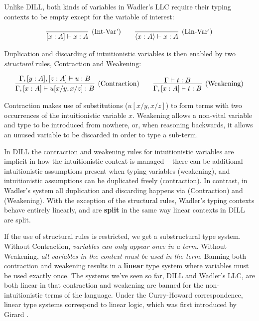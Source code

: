 \documentclass[]{unswthesis}
\newcommand{\types}{\vdash}
\let\i\textit
\let\b\textbf
\let\t\text
\begin{document}
Unlike DILL, both kinds of variables in Wadler's LLC require their typing contexts to be empty except for the variable of interest:

\begin{eqnarray*}
\infer[\t{(Int-Var')}]{[x : A] \types x : A}{} \qquad
\infer[\t{(Lin-Var')}]{\langle x : A \rangle \types x : A}{}
\end{eqnarray*}

Duplication and discarding of intuitionistic variables is then enabled by two \i{structural} rules, Contraction and Weakening:

\begin{eqnarray*}
\infer[\t{(Contraction)}]{\Gamma, [x : A] \types u[x/y, x/z] : B}{
  \Gamma, [y : A], [z : A] \types u : B
}
\qquad
\infer[\text{(Weakening)}]{\Gamma, [x : A] \types t : B}{
  \Gamma \types t : B
}
\end{eqnarray*}

Contraction makes use of substitutions ($u[x/y, x/z]$) to form terms with two occurrences of the intuitionistic variable $x$. Weakening allows a non-vital variable and type to be introduced from nowhere, or, when reasoning backwards, it allows an unused variable to be discarded in order to type a sub-term.

In DILL the contraction and weakening rules for intuitionistic variables are implicit in how the intuitionistic context is managed -- there can be additional intuitionistic assumptions present when typing variables (weakening), and intuitionistic assumptions can be duplicated freely (contraction). In contrast, in Wadler's system all duplication and discarding happens via (Contraction) and (Weakening). With the exception of the structural rules, Wadler's typing contexts behave entirely linearly, and are \b{split} in the same way linear contexts in DILL are split.

If the use of structural rules is restricted, we get a substructural type system. Without Contraction, \i{variables can only appear once in a term}. Without Weakening, \i{all variables in the context must be used in the term}. Banning both contraction and weakening results in a \b{linear} type system where variables must be used exactly once. The systems we've seen so far, DILL and Wadler's LLC, are both linear in that contraction and weakening are banned for the non-intuitionistic terms of the language. Under the Curry-Howard correspondence, linear type systems correspond to linear logic, which was first introduced by Girard \cite{girard87}.
\end{document}
